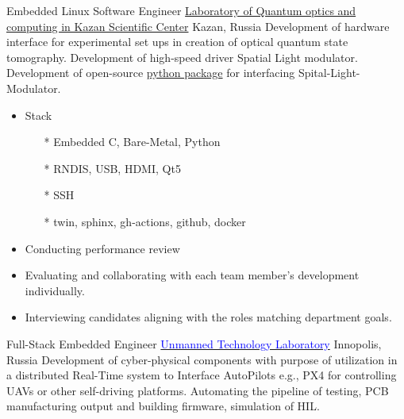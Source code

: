         {Embedded Linux Software Engineer}
        {\href{http://kfti.knc.ru/}{\color{blue}Laboratory of Quantum optics and  computing  in  Kazan Scientific Center}}
        {Kazan, Russia}
        {
        \newline
        Development of hardware interface for experimental set ups in creation of optical quantum state tomography. 
        Development of high-speed driver Spatial Light modulator.
        Development of open-source \href{https://pypi.org/project/holoeye-embedded/}{\color{blue}python package} for interfacing Spital-Light-Modulator.    
        } 
        {
        \begin{itemize}
            \item Stack
                \begin{itemize}
                \item[*] Embedded C, Bare-Metal, Python
                \item[*] RNDIS, USB, HDMI, Qt5
                \item[*] SSH
                \item[*] twin, sphinx, gh-actions, github, docker
                \end{itemize}
            \item Conducting performance review
            \item Evaluating and collaborating with each team member’s development individually.
            \item Interviewing  candidates aligning with the roles matching department goals.
        \end{itemize}
        }
        {Full-Stack Embedded Engineer}
        {\href{https://robotics.innopolis.university/en/labs/laboratoriya-bespilotnyh-technologyi/}{\textcolor{blue}{Unmanned Technology Laboratory}}}
        {Innopolis, Russia}
        {
        \newline
        Development of cyber-physical components with purpose of utilization in a distributed Real-Time system to Interface AutoPilots e.g., PX4 for controlling UAVs or other self-driving platforms. Automating the pipeline of testing, PCB manufacturing output and building firmware, simulation of HIL.
        } 
